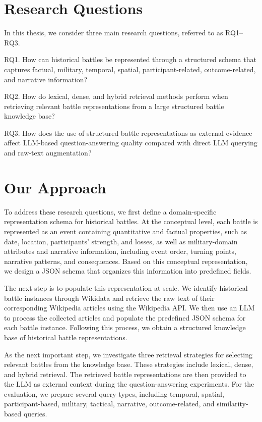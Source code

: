\section{Research Questions}
\label{sec:research-questions}
In this thesis, we consider three main research questions, referred to as RQ1–RQ3.

RQ1. How can historical battles be represented through a structured schema that captures factual, military, temporal, spatial, participant-related, outcome-related, and narrative information?

RQ2. How do lexical, dense, and hybrid retrieval methods perform when retrieving relevant battle representations from a large structured battle knowledge base?

RQ3. How does the use of structured battle representations as external evidence affect LLM-based question-answering quality compared with direct LLM querying and raw-text augmentation?
\section{Our Approach}
\label{sec:our-approach}
To address these research questions, we first define a domain-specific representation schema for historical battles. At the conceptual level, each battle is represented as an event containing quantitative and factual properties, such as date, location, participants’ strength, and losses, as well as military-domain attributes and narrative information, including event order, turning points, narrative patterns, and consequences. Based on this conceptual representation, we design a JSON schema that organizes this information into predefined fields.

The next step is to populate this representation at scale. We identify historical battle instances through Wikidata and retrieve the raw text of their corresponding Wikipedia articles using the Wikipedia API. We then use an LLM to process the collected articles and populate the predefined JSON schema for each battle instance. Following this process, we obtain a structured knowledge base of historical battle representations.

As the next important step, we investigate three retrieval strategies for selecting relevant battles from the knowledge base. These strategies include lexical, dense, and hybrid retrieval. The retrieved battle representations are then provided to the LLM as external context during the question-answering experiments. For the evaluation, we prepare several query types, including temporal, spatial, participant-based, military, tactical, narrative, outcome-related, and similarity-based queries.

